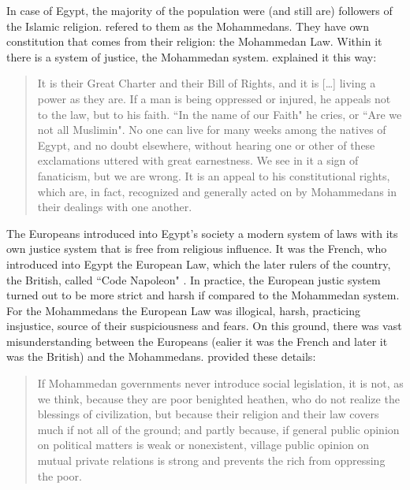 In case of Egypt, the majority of the population were (and still are) followers of the Islamic religion. \citeauthor{innes1909} refered to them as the Mohammedans. They have own constitution that comes from their religion: the Mohammedan Law. Within it there is a system of justice, the Mohammedan system. \citeauthor{innes1909} explained it this way:

\begin{quote}
It is their Great Charter and their Bill of Rights, and it is [\dots] living a power as they are. If a man is being oppressed or injured, he appeals not to the law, but to his faith. ``In the name of our Faith" he cries, or ``Are we not all Muslimin". No one can live for many weeks among the natives of Egypt, and no doubt elsewhere, without hearing one or other of these exclamations uttered with great earnestness. We see in it a sign of fanaticism, but we are wrong. It is an appeal to his constitutional rights, which are, in fact, recognized and generally acted on by Mohammedans in their dealings with one another. \citep[p.~12]{innes1909}
\end{quote}

The Europeans introduced into Egypt's society a modern system of laws with its own justice system that is free from religious influence. It was the French, who introduced into Egypt the European Law, which the later rulers of the country, the British, called ``Code Napoleon" \citep[p.~16]{innes1909}. In practice, the European justic system turned out to be more strict and harsh if compared to the Mohammedan system. For the Mohammedans the European Law was illogical, harsh, practicing insjustice, source of their suspiciousness and fears. On this ground, there was vast misunderstanding between the Europeans (ealier it was the French and later it was the British) and the Mohammedans. \citeauthor{innes1909} provided these details:

\begin{quote}
If Mohammedan governments never introduce social legislation, it is not, as we think, because they are poor benighted heathen, who do not realize the blessings of civilization, but because their religion and their law covers much if not all of the ground; and partly because, if general public opinion on political matters is weak or nonexistent, village public opinion on mutual private relations is strong and prevents the rich from oppressing the poor.~\citep[p.~13]{innes1909}
\end{quote}

